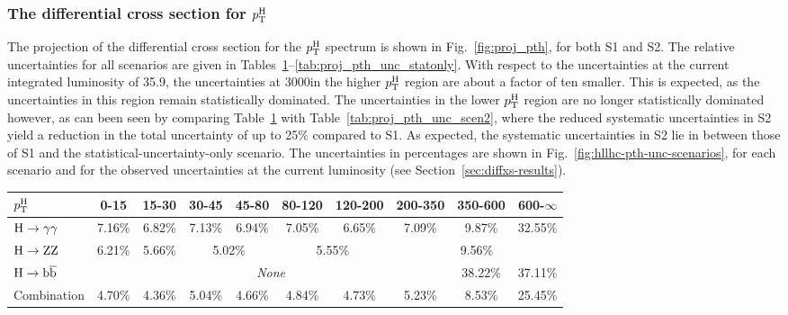 \subsubsection{The differential cross section for \texorpdfstring{$p_\mathrm{T}^\mathrm{H}$}{pTH}}

The projection of the differential cross section for the $p_\mathrm{T}^\mathrm{H}$ spectrum is shown in Fig.~\ref{fig:proj_pth}, for both S1 and S2.
% 
The relative uncertainties for all scenarios are given in Tables~\ref{tab:proj_pth_unc_scen1}--\ref{tab:proj_pth_unc_statonly}.
% 
With respect to the uncertainties at the current integrated luminosity of 35.9\fbinv, the uncertainties at 3000\fbinv in the higher $p_\mathrm{T}^\mathrm{H}$ region are about a factor of ten smaller. This is expected, as the uncertainties in this region remain statistically dominated.
% 
The uncertainties in the lower $p_\mathrm{T}^\mathrm{H}$ region are no longer statistically dominated however, as can been seen by comparing Table~\ref{tab:proj_pth_unc_scen1} with Table~\ref{tab:proj_pth_unc_scen2}, where the reduced systematic uncertainties in S2 yield a reduction in the total uncertainty of up to 25\% compared to S1.
% 
As expected, the systematic uncertainties in S2 lie in between those of S1 and the statistical-uncertainty-only scenario.
% 
The uncertainties in percentages are shown in Fig.~\ref{fig:hllhc-pth-unc-scenarios}, for each scenario and for the observed uncertainties at the current luminosity (see Section~\ref{sec:diffxs-results}).


\begin{table}[htb]
\centering
{}
\label{tab:proj_pth_unc_scen1}
\begin{tabular}{|l|c|c|c|c|c|c|c|c|c|}
\hline
$p_\mathrm{T}^\mathrm{H}$       & 0-15    &  15-30   &  30-45    &  45-80   &  80-120  &  120-200  &  200-350  &  350-600  &  600-$\infty$  \\
\hline
$\mathrm{H}\to\mathrm{\gamma}\mathrm{\gamma}$       & 7.16\%  &  6.82\%  &  7.13\%   &  6.94\%  &  7.05\%  &  6.65\%   &  7.09\%   &  9.87\%   &  32.55\%  \\
\hline
$\mathrm{H}\to\mathrm{Z}\mathrm{Z}$       & 6.21\%  &  5.66\%  &  \multicolumn{2}{c|}{5.02\%}  &  \multicolumn{2}{c|}{5.55\%}  &  \multicolumn{3}{c|}{9.56\%} \\
\hline
$\mathrm{H}\to\mathrm{b}\overline{\mathrm{b}}$       & \multicolumn{7}{c|}{\textit{None}}                                                       &  38.22\%  &  37.11\%  \\
\hline
Combination  & 4.70\%  &  4.36\%  &  5.04\%   &  4.66\%  &  4.84\%  &  4.73\%   &  5.23\%   &  8.53\%   &  25.45\%  \\
\hline
\end{tabular}
\end{table}

